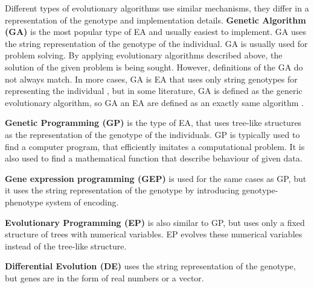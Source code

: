 Different types of evolutionary algorithms use similar mechanisms, they differ in a representation of the genotype and implementation details.
\textbf{Genetic Algorithm (GA)} is the most popular type of EA and usually easiest to implement. GA uses the string representation of the genotype of the individual. GA is usually used for problem solving. By applying evolutionary algorithms described above, the solution of the given problem is being sought. However, definitions of the GA do not always match. In more cases, GA is EA that uses only string genotypes for representing the individual , but in some literature, GA is defined as the generic evolutionary algorithm, so GA an EA are defined as an exactly same algorithm .

\textbf{Genetic Programming (GP)} is the type of EA, that uses tree-like structures as the representation of the genotype of the individuals. GP is typically used to find a computer program, that efficiently imitates a computational problem. It is also used to find a mathematical function that describe behaviour of given data.

\textbf{Gene expression programming (GEP)} is used for the same cases as GP, but it uses the string representation of the genotype by introducing genotype-phenotype system of encoding.

\textbf{Evolutionary Programming (EP)} is also similar to GP, but uses only a fixed structure of trees with numerical variables. EP evolves these numerical variables instead of the tree-like structure.

\textbf{Differential Evolution (DE)} uses the string representation of the genotype, but genes are in the form of real numbers or a vector.
